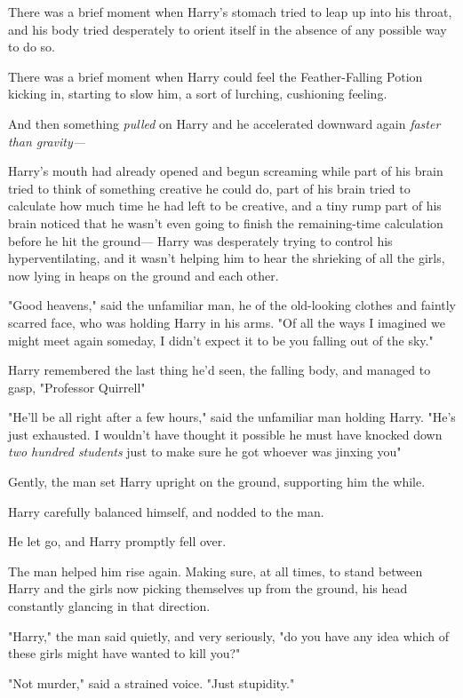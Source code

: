 There was a brief moment when Harry's stomach tried to leap up into his throat,
and his body tried desperately to orient itself in the absence of any possible
way to do so.

There was a brief moment when Harry could feel the Feather-Falling Potion
kicking in, starting to slow him, a sort of lurching, cushioning feeling.

And then something \emph{pulled} on Harry and he accelerated downward again
\emph{faster than gravity---}

Harry's mouth had already opened and begun screaming while part of his brain
tried to think of something creative he could do, part of his brain tried to
calculate how much time he had left to be creative, and a tiny rump part of his
brain noticed that he wasn't even going to finish the remaining-time
calculation before he hit the ground---
\sbreak
Harry was desperately trying to control his hyperventilating, and it wasn't
helping him to hear the shrieking of all the girls, now lying in heaps on the
ground and each other.

"Good heavens," said the unfamiliar man, he of the old-looking clothes and
faintly scarred face, who was holding Harry in his arms. "Of all the ways I
imagined we might meet again someday, I didn't expect it to be you falling out
of the sky."

Harry remembered the last thing he'd seen, the falling body, and managed to
gasp, "Professor{\el} Quirrell{\el}"

"He'll be all right after a few hours," said the unfamiliar man holding Harry.
"He's just exhausted. I wouldn't have thought it possible{\el} he must have
knocked down \emph{two hundred students} just to make sure he got whoever was
jinxing you{\el}"

Gently, the man set Harry upright on the ground, supporting him the while.

Harry carefully balanced himself, and nodded to the man.

He let go, and Harry promptly fell over.

The man helped him rise again. Making sure, at all times, to stand between
Harry and the girls now picking themselves up from the ground, his head
constantly glancing in that direction.

"Harry," the man said quietly, and very seriously, "do you have any idea which
of these girls might have wanted to kill you?"

"Not murder," said a strained voice. "Just stupidity."

